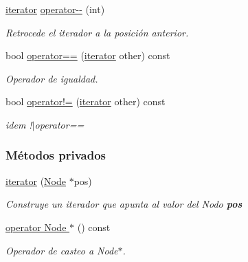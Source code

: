 \begin{DoxyCompactItemize}
\hyperlink{classaed2_1_1iterator_1_1iterator}{iterator} \hyperlink{classaed2_1_1iterator_1_1iterator_a6bd61026c75767d0d41e45229144e9d0_a6bd61026c75767d0d41e45229144e9d0}{operator-\/-\/} (int)
\begin{DoxyCompactList}\small\item\em \-Retrocede el iterador a la posición anterior. \end{DoxyCompactList}\item 
bool \hyperlink{classaed2_1_1iterator_1_1iterator_a479ef64daa1f0e82b05fa1f80d57f479_a479ef64daa1f0e82b05fa1f80d57f479}{operator==} (\hyperlink{classaed2_1_1iterator_1_1iterator}{iterator} other) const 
\begin{DoxyCompactList}\small\item\em \-Operador de igualdad. \end{DoxyCompactList}\item 
bool \hyperlink{classaed2_1_1iterator_1_1iterator_a8facdf09114b97042cf3d6403ba1d719_a8facdf09114b97042cf3d6403ba1d719}{operator!=} (\hyperlink{classaed2_1_1iterator_1_1iterator}{iterator} other) const 
\begin{DoxyCompactList}\small\item\em idem !$|$operator== \end{DoxyCompactList}\end{DoxyCompactItemize}
\subsubsection*{\-Métodos privados}
\begin{DoxyCompactItemize}
\item 
\hyperlink{classaed2_1_1iterator_1_1iterator_ae005a5a576e31702ee17841c74e55684_ae005a5a576e31702ee17841c74e55684}{iterator} (\hyperlink{structaed2_1_1iterator_1_1Node}{\-Node} $\ast$pos)
\begin{DoxyCompactList}\small\item\em \-Construye un iterador que apunta al valor del \-Nodo {\bfseries pos} \end{DoxyCompactList}\item 
\hyperlink{classaed2_1_1iterator_1_1iterator_a12950b9a0659e6b9314b1a3a48bd50ac_a12950b9a0659e6b9314b1a3a48bd50ac}{operator Node $\ast$} () const 
\begin{DoxyCompactList}\small\item\em \-Operador de casteo a \-Node$\ast$. \end{DoxyCompactList}\end{DoxyCompactItemize}
